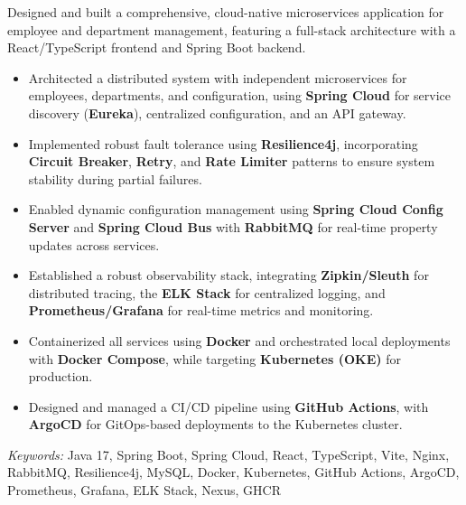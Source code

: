 \nointent {}

 
\nointent Designed and built a comprehensive, cloud-native microservices application for employee and department management, featuring a full-stack architecture with a React/TypeScript frontend and Spring Boot backend. 
 
\begin{itemize}
    \item Architected a distributed system with independent microservices for employees, departments, and configuration, using \textbf{Spring Cloud} for service discovery (\textbf{Eureka}), centralized configuration, and an API gateway.
    \item Implemented robust fault tolerance using \textbf{Resilience4j}, incorporating \textbf{Circuit Breaker}, \textbf{Retry}, and \textbf{Rate Limiter} patterns to ensure system stability during partial failures.
    \item Enabled dynamic configuration management using \textbf{Spring Cloud Config Server} and \textbf{Spring Cloud Bus} with \textbf{RabbitMQ} for real-time property updates across services.
    \item Established a robust observability stack, integrating \textbf{Zipkin/Sleuth} for distributed tracing, the \textbf{ELK Stack} for centralized logging, and \textbf{Prometheus/Grafana} for real-time metrics and monitoring.
    \item Containerized all services using \textbf{Docker} and orchestrated local deployments with \textbf{Docker Compose}, while targeting \textbf{Kubernetes (OKE)} for production.
    \item Designed and managed a CI/CD pipeline using \textbf{GitHub Actions}, with \textbf{ArgoCD} for GitOps-based deployments to the Kubernetes cluster.
\end{itemize} 
 
\noindent \textit{Keywords:} Java 17, Spring Boot, Spring Cloud, React, TypeScript, Vite, Nginx, RabbitMQ, Resilience4j, MySQL, Docker, Kubernetes, GitHub Actions, ArgoCD, Prometheus, Grafana, ELK Stack, Nexus, GHCR 
 
\vspace{1em}